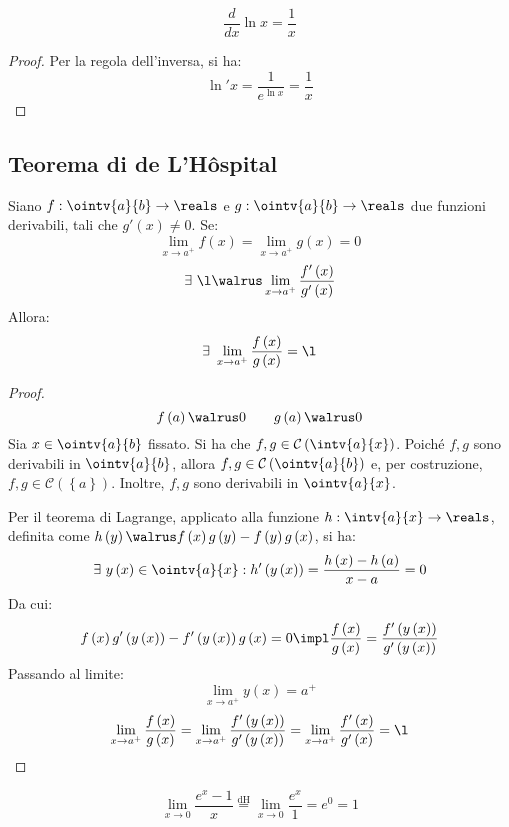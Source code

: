\begin{theorem}
  $$\frac{d}{dx}\ln x=\frac{1}{x}$$
\end{theorem}
\begin{proof}
  Per la regola dell'inversa, si ha:
  $$\ln'x=\frac{1}{e^{\ln x}}=\frac{1}{x}$$
\end{proof}

\subsection{Teorema di de L'Hôspital}

\begin{theorem}
  Siano $f:\ointv{a}{b}\to\reals$ e $g:\ointv{a}{b}\to\reals$ due funzioni derivabili, tali che $g'\left( x \right)\neq0$. Se:
  $$\lim_{x\to a^+}f\left( x \right)=\lim_{x\to a^+}g\left( x \right)=0$$
  $$\exists\ \l\walrus\lim_{x\to a^+}\frac{f'\left( x \right)}{g'\left( x \right)}$$
  Allora:
  $$\exists\ \lim_{x\to a^+}\frac{f\left( x \right)}{g\left( x \right)}=\l$$
\end{theorem}
\begin{proof}
  $$f\left( a \right)\walrus0\qquad g\left( a \right)\walrus0$$
  Sia $x\in\ointv{a}{b}$ fissato. Si ha che $f,g\in\mathcal{C}\left( \intv{a}{x} \right)$. Poiché $f,g$ sono derivabili in $\ointv{a}{b}$, allora $f,g\in\mathcal{C}\left( \ointv{a}{b} \right)$ e, per costruzione, $f,g\in\mathcal{C}\left( \left\{ a \right\} \right)$.
  Inoltre, $f,g$ sono derivabili in $\ointv{a}{x}$.
  
  Per il teorema di Lagrange, applicato alla funzione $h:\intv{a}{x}\to\reals$, definita come $h\left( y \right)\walrus f\left( x \right)g\left( y \right)-f\left( y \right)g\left( x \right)$, si ha:
  $$\exists\ y\left( x \right)\in\ointv{a}{x}:h'\left( y\left( x \right) \right)=\frac{h\left( x \right)-h\left( a \right)}{x-a}=0$$
  Da cui:
  $$f\left( x \right)g'\left( y\left( x \right) \right)-f'\left( y\left( x \right) \right)g\left( x \right)=0\impl \frac{f\left( x \right)}{g\left( x \right)}=\frac{f'\left( y\left( x \right) \right)}{g'\left( y\left( x \right) \right)}$$
  Passando al limite:
  $$\lim_{x\to a^+}y\left( x \right)=a^+$$
  $$\lim_{x\to a^+}\frac{f\left( x \right)}{g\left( x \right)}=\lim_{x\to a^+}\frac{f'\left( y\left( x \right) \right)}{g'\left( y\left( x \right) \right)}=\lim_{x\to a^+}\frac{f'\left( x \right)}{g'\left( x \right)}=\l$$
\end{proof}

\begin{example}
  $$\lim_{x\to0}\frac{e^x-1}{x}\stackrel{\text{dH}}{=}\lim_{x\to0}\frac{e^x}{1}=e^0=1$$
\end{example}

